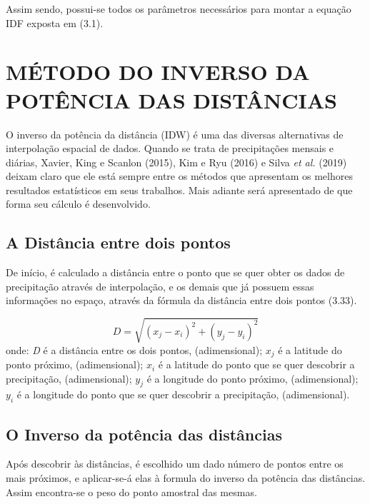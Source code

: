 Assim sendo, possui-se todos os parâmetros necessários para montar a equação IDF exposta em (3.1).

\newpage

\section{MÉTODO DO INVERSO DA POTÊNCIA DAS DISTÂNCIAS}\bigskip

O inverso da potência da distância (IDW) é uma das diversas alternativas de interpolação espacial de dados. Quando se trata de precipitações mensais e diárias, Xavier, King e Scanlon (2015), Kim e Ryu (2016) e Silva \textit{et al.} (2019) deixam claro que ele está sempre entre os métodos que apresentam os melhores resultados estatísticos em seus trabalhos. Mais adiante será apresentado de que forma seu cálculo é desenvolvido.\bigskip

\subsection{A Distância entre dois pontos}\bigskip

De início, é calculado a distância entre o ponto que se quer obter os dados de precipitação através de interpolação, e os demais que já possuem essas informações no espaço, através da fórmula da distância entre dois pontos (3.33).\bigskip

\begin{equation}
D = \sqrt{{\left(x_j - x_i\right)}^2 + {\left(y_j - y_i\right)}^2}
\end{equation}
\newline
onde:
\newline
\textit{D} é a distância entre os dois pontos, (adimensional);
\newline
$x_j$ é a latitude do ponto próximo, (adimensional);
\newline
$x_i$ é a latitude do ponto que se quer descobrir a precipitação, (adimensional);
\newline
$y_j$ é a longitude do ponto próximo, (adimensional);
\newline
$y_i$ é a longitude do ponto que se quer descobrir a precipitação, (adimensional).\bigskip

\subsection{O Inverso da potência das distâncias}\bigskip

Após descobrir às distâncias, é escolhido um dado número de pontos entre os mais próximos, e aplicar-se-á elas à formula do inverso da potência das distâncias. Assim encontra-se o peso do ponto amostral das mesmas. 

